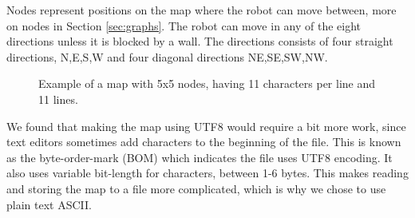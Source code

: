 Nodes represent positions on the map where the robot can move between, more on nodes in Section \ref{sec:graphs}. 
The robot can move in any of the eight directions unless it is blocked by a wall. 
The directions consists of four straight directions, N,E,S,W and four diagonal directions NE,SE,SW,NW. 
\begin{figure}[htp]
    \centering
    \hspace{0.2\textwidth}
    \caption{Example of a map with 5x5 nodes, having 11 characters per line and 11 lines.}
    \label{fig:5x5map}
\end{figure}

We found that making the map using UTF8 would require a bit more work, 
since text editors sometimes add characters to the beginning of the file. 
This is known as the byte-order-mark (BOM) which indicates the file uses UTF8 encoding. 
It also uses variable bit-length for characters, between 1-6 bytes.
This makes reading and storing the map to a file more complicated, which is why we chose to use plain text ASCII.

